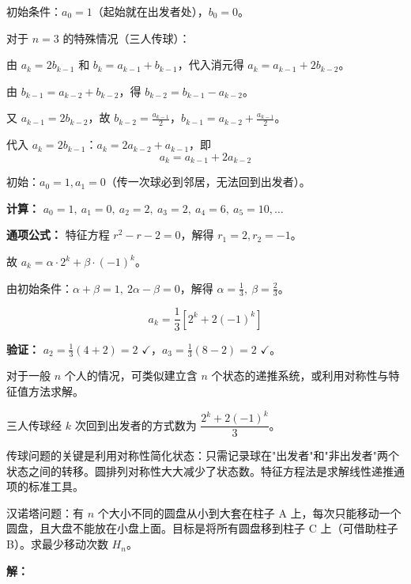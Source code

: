 \documentclass[12pt, a4paper]{ctexart}
\begin{document}
初始条件：\(a_0 = 1\)（起始就在出发者处），\(b_0 = 0\)。

对于 \textbf{\(n=3\)} 的特殊情况（三人传球）：

由 \(a_k = 2b_{k-1}\) 和 \(b_k = a_{k-1}+b_{k-1}\)，代入消元得 \(a_k = a_{k-1}+2b_{k-2}\)。

由 \(b_{k-1} = a_{k-2}+b_{k-2}\)，得 \(b_{k-2} = b_{k-1}-a_{k-2}\)。

又 \(a_{k-1} = 2b_{k-2}\)，故 \(b_{k-2} = \frac{a_{k-1}}{2}\)，\(b_{k-1} = a_{k-2}+\frac{a_{k-1}}{2}\)。

代入 \(a_k = 2b_{k-1}\)：\(a_k = 2a_{k-2}+a_{k-1}\)，即
\[
a_k = a_{k-1} + 2a_{k-2}
\]

初始：\(a_0=1, a_1=0\)（传一次球必到邻居，无法回到出发者）。

\textbf{计算：} \(a_0=1,\ a_1=0,\ a_2=2,\ a_3=2,\ a_4=6,\ a_5=10,\ldots\)

\textbf{通项公式：} 特征方程 \(r^2 - r - 2 = 0\)，解得 \(r_1=2, r_2=-1\)。

故 \(a_k = \alpha \cdot 2^k + \beta \cdot (-1)^k\)。

由初始条件：\(\alpha+\beta=1,\ 2\alpha-\beta=0\)，解得 \(\alpha=\frac{1}{3},\ \beta=\frac{2}{3}\)。

\[
a_k = \frac{1}{3}\left[2^k + 2(-1)^k\right]
\]

\textbf{验证：} \(a_2 = \frac{1}{3}(4+2) = 2\) \(\checkmark\)，\(a_3 = \frac{1}{3}(8-2) = 2\) \(\checkmark\)。

对于一般 \(n\) 个人的情况，可类似建立含 \(n\) 个状态的递推系统，或利用对称性与特征值方法求解。

三人传球经 \(k\) 次回到出发者的方式数为 \(\boxed{\dfrac{2^k + 2(-1)^k}{3}}\)。

\begin{tipbox}[方法总结]
传球问题的关键是利用对称性简化状态：只需记录球在"出发者"和"非出发者"两个状态之间的转移。圆排列对称性大大减少了状态数。特征方程法是求解线性递推通项的标准工具。
\end{tipbox}

\vspace{6pt}

\begin{examplebox}
汉诺塔问题：有 \(n\) 个大小不同的圆盘从小到大套在柱子 A 上，每次只能移动一个圆盘，且大盘不能放在小盘上面。目标是将所有圆盘移到柱子 C 上（可借助柱子 B）。求最少移动次数 \(H_n\)。
\end{examplebox}

\textbf{解：}
\end{document}
